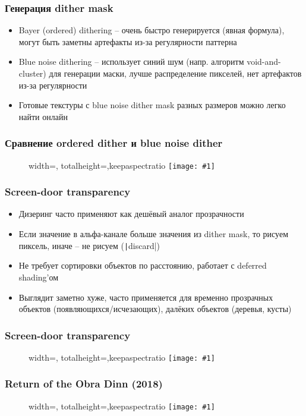 \documentclass[10pt]{beamer}
\newcommand{\slideimage}[1]{
  \begin{figure}
    \begin{adjustbox}{width=\textwidth, totalheight=\textheight-2\baselineskip-2\baselineskip,keepaspectratio}
      \texttt{[image: \#1]}
    \end{adjustbox}
  \end{figure}
}
\begin{document}
\begin{frame}[fragile]
\frametitle{Генерация dither mask}
\begin{itemize}
\item Bayer (ordered) dithering -- очень быстро генерируется (явная формула), могут быть заметны артефакты из-за регулярности паттерна
\pause
\item Blue noise dithering -- использует синий шум (напр. алгоритм void-and-cluster) для генерации маски, лучше распределение пикселей, нет артефактов из-за регулярности
\pause
\item Готовые текстуры с blue noise dither mask разных размеров можно легко найти онлайн
\end{itemize}
\end{frame}

\begin{frame}[fragile]
\frametitle{Сравнение ordered dither и blue noise dither}
\slideimage{dither-mask-compare.png}
\end{frame}

\begin{frame}[fragile]
\frametitle{Screen-door transparency}
\begin{itemize}
\item Дизеринг часто применяют как дешёвый аналог прозрачности
\pause
\item Если значение в альфа-канале больше значения из dither mask, то рисуем пиксель, иначе -- не рисуем (\texttt|discard|)
\pause
\item Не требует сортировки объектов по расстоянию, работает с deferred shading'ом
\pause
\item Выглядит заметно хуже, часто применяется для временно прозрачных объектов (появляющихся/исчезающих), далёких объектов (деревья, кусты)
\end{itemize}
\end{frame}

\begin{frame}[fragile]
\frametitle{Screen-door transparency}
\slideimage{dither-transparency.png}
\end{frame}

\begin{frame}[fragile]
\frametitle{Return of the Obra Dinn (2018)}
\slideimage{obra-dinn.png}
\end{frame}
\end{document}
